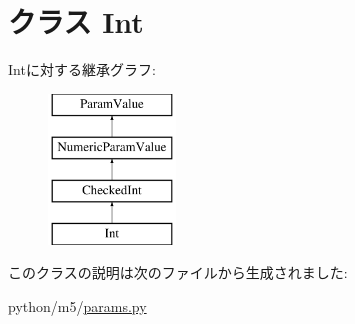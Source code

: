 \hypertarget{classm5_1_1params_1_1Int}{
\section{クラス Int}
\label{classm5_1_1params_1_1Int}
}
Intに対する継承グラフ:\begin{figure}[H]
\begin{center}
\leavevmode
\includegraphics[height=4cm]{classm5_1_1params_1_1Int}
\end{center}
\end{figure}


このクラスの説明は次のファイルから生成されました:\begin{DoxyCompactItemize}
\item 
python/m5/\hyperlink{params_8py}{params.py}\end{DoxyCompactItemize}
